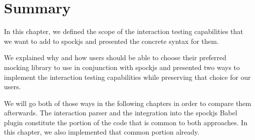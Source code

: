 \section{Summary}
In this chapter, we defined the scope
of the interaction testing capabilities
that we want to add to spockjs
and presented the concrete syntax for them.

We explained why and how users should be able
to choose their preferred mocking library
to use in conjunction with spockjs and
presented two ways to implement the interaction testing capabilities
while preserving that choice for our users.

We will go both of those ways in the following chapters
in order to compare them afterwards.
The interaction parser and
the integration into the spockjs Babel plugin
constitute the portion of the code
that is common to both approaches.
In this chapter, we also implemented that common portion already.

